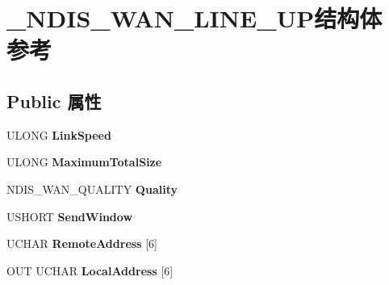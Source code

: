 \hypertarget{struct___n_d_i_s___w_a_n___l_i_n_e___u_p}{}\section{\+\_\+\+N\+D\+I\+S\+\_\+\+W\+A\+N\+\_\+\+L\+I\+N\+E\+\_\+\+U\+P结构体 参考}
\label{struct___n_d_i_s___w_a_n___l_i_n_e___u_p}
\subsection*{Public 属性}
\begin{DoxyCompactItemize}
\item 
\mbox{\label{struct___n_d_i_s___w_a_n___l_i_n_e___u_p_a64be47380f765f8fe9d16034e4594eda}} 
U\+L\+O\+NG {\bfseries Link\+Speed}
\item 
\mbox{\label{struct___n_d_i_s___w_a_n___l_i_n_e___u_p_a60d4929e5ce50a2d099609fff17ddf9f}} 
U\+L\+O\+NG {\bfseries Maximum\+Total\+Size}
\item 
\mbox{\label{struct___n_d_i_s___w_a_n___l_i_n_e___u_p_a8234318068ebf6123c3b397f1fa6f32d}} 
N\+D\+I\+S\+\_\+\+W\+A\+N\+\_\+\+Q\+U\+A\+L\+I\+TY {\bfseries Quality}
\item 
\mbox{\label{struct___n_d_i_s___w_a_n___l_i_n_e___u_p_aa6008f075bb4a0239a9441a6680e7d76}} 
U\+S\+H\+O\+RT {\bfseries Send\+Window}
\item 
\mbox{\label{struct___n_d_i_s___w_a_n___l_i_n_e___u_p_ad488544134bb5d3c1e84ba96caf3bd36}} 
U\+C\+H\+AR {\bfseries Remote\+Address} \mbox{[}6\mbox{]}
\item 
\mbox{\label{struct___n_d_i_s___w_a_n___l_i_n_e___u_p_ab92a85e60da24ee0a32b789aa5cf88bf}} 
O\+UT U\+C\+H\+AR {\bfseries Local\+Address} \mbox{[}6\mbox{]}
\item 
\mbox{\label{struct___n_d_i_s___w_a_n___l_i_n_e___u_p_a3f0b41b13a9d883ef2ad1f71ca644566}} 

\end{DoxyCompactItemize}
